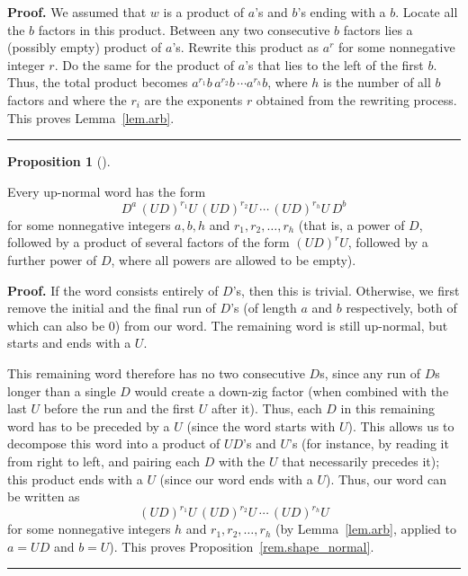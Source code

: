 \documentclass[numbers=enddot,12pt,final,onecolumn,notitlepage]{scrartcl}%
\theoremstyle{definition}
\newtheorem{prop}[theo]{Proposition}
\newenvironment{proposition}[1][]
{\begin{prop}[#1]\begin{leftbar}}
{\end{leftbar}\end{prop}}
\newenvironment{proof}[1][Proof]{\noindent\textbf{#1.} }{\ \rule{0.5em}{0.5em}}
\newenvironment{verlong}{}{}
\begin{document}
\begin{verlong}
\begin{proof}
We assumed that $w$ is a product of $a$'s and $b$'s ending with a $b$.
Locate all the $b$ factors in this product. Between any two consecutive $b$ factors lies a (possibly empty) product of $a$'s.
Rewrite this product as $a^r$ for some nonnegative integer $r$. Do the same for the product of $a$'s that lies to the left of the first $b$.
Thus, the total product becomes $a^{r_1}b\, a^{r_2}b\, \cdots a^{r_h}b$, where $h$ is the number of all $b$ factors and where the $r_i$ are the exponents $r$ obtained from the rewriting process.
This proves Lemma~\ref{lem.arb}.
\end{proof}
\end{verlong}

\begin{proposition}
\label{rem.shape_normal}
Every up-normal word has the form
\[
D^a\, (UD)^{r_1}U\, (UD)^{r_2}U\, \cdots\, (UD)^{r_h}U\, D^b
\]
for some nonnegative integers $a,b,h$ and $r_1,r_2,\ldots,r_h$
(that is, a power of $D$, followed by a product of several factors of the form $(UD)^r U$, followed by a further power of $D$, where all powers are allowed to be empty).
\end{proposition}

\begin{proof}
If the word consists entirely of $D$'s, then this is trivial.
Otherwise, we first remove the initial and the final run of $D$'s (of length $a$ and $b$ respectively, both of which can also be $0$) from our word. The remaining word is still up-normal, but starts and ends with a $U$.

This remaining word therefore has no two consecutive $D$s, since any run of $D$s longer than a single $D$ would create a down-zig factor (when combined with the last $U$ before the run and the first $U$ after it).
Thus, each $D$ in this remaining word has to be preceded
by a $U$ (since the word starts with $U$).
This allows us to decompose this word into a product of $UD$'s and $U$'s (for instance, by reading it from right to left, and pairing each $D$ with the $U$ that necessarily precedes it); this product ends with a $U$ (since our word ends with a $U$).
Thus, our word can be written as
\[
(UD)^{r_1}U\, (UD)^{r_2}U\, \cdots\, (UD)^{r_h}U
\]
for some nonnegative integers $h$ and $r_1, r_2, \ldots, r_h$ (by Lemma~\ref{lem.arb}, applied to $a = UD$ and $b = U$).
This proves Proposition~\ref{rem.shape_normal}.
\end{proof}
\end{document}
